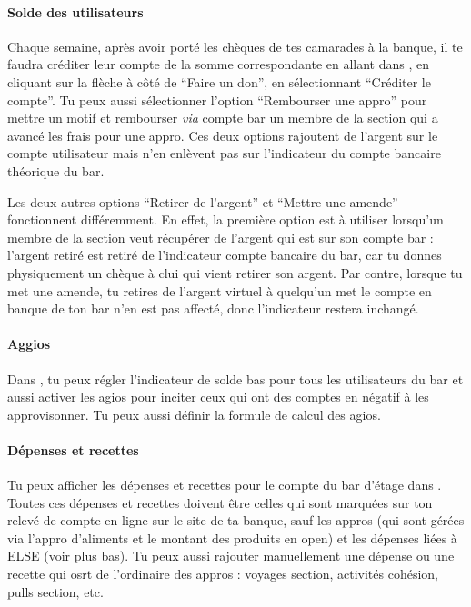\documentclass[12pt,french]{article}
\begin{document}
\paragraph{Solde des utilisateurs} Chaque semaine, après avoir porté les chèques de tes camarades à la banque, il te faudra créditer leur compte de la somme correspondante en allant dans , en cliquant sur la flèche à côté de \enquote{Faire un don}, en sélectionnant \enquote{Créditer le compte}. Tu peux aussi sélectionner l'option \enquote{Rembourser une appro} pour mettre un motif et rembourser \emph{via} compte bar un membre de la section qui a avancé les frais pour une appro. Ces deux options rajoutent de l'argent sur le compte utilisateur mais n'en enlèvent pas sur l'indicateur du compte bancaire théorique du bar.

Les deux autres options \enquote{Retirer de l'argent} et \enquote{Mettre une amende} fonctionnent différemment. En effet, la première option est à utiliser lorsqu'un membre de la section veut récupérer de l'argent qui est sur son compte bar : l'argent retiré est retiré de l'indicateur compte bancaire du bar, car tu donnes physiquement un chèque à clui qui vient retirer son argent. Par contre, lorsque tu met une amende, tu retires de l'argent virtuel à quelqu'un met le compte en banque de ton bar n'en est pas affecté, donc l'indicateur restera inchangé.

\paragraph{Aggios} Dans , tu peux régler l'indicateur de solde bas pour tous les utilisateurs du bar et aussi activer les agios pour inciter ceux qui ont des comptes en négatif à les approvisonner. Tu peux aussi définir la formule de calcul des agios.

\paragraph{Dépenses et recettes} Tu peux afficher les dépenses et recettes pour le compte du bar d'étage dans . Toutes ces dépenses et recettes doivent être celles qui sont marquées sur ton relevé de compte en ligne sur le site de ta banque, sauf les appros (qui sont gérées via l'appro d'aliments et le montant des produits en open) et les dépenses liées à ELSE (voir plus bas). Tu peux aussi rajouter manuellement une dépense ou une recette qui osrt de l'ordinaire des appros : voyages section, activités cohésion, pulls section, etc.
\end{document}
